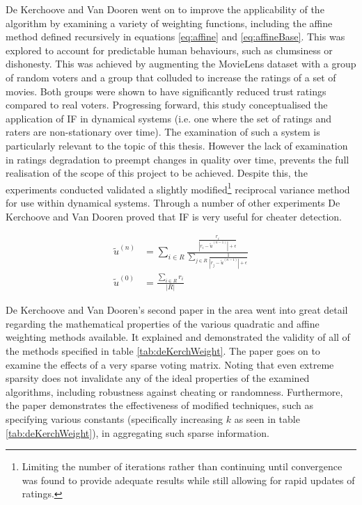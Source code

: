 De Kerchoove and Van Dooren \cite{de2007iterative} went on to improve the applicability of the algorithm by examining a variety of weighting functions, including the affine method defined recursively in equations \ref{eq:affine} and \ref{eq:affineBase}. This was explored to account for predictable human behaviours, such as clumsiness or dishonesty. This was achieved by augmenting the MovieLens dataset with a group of random voters and a group that colluded to increase the ratings of a set of movies. Both groups were shown to have significantly reduced trust ratings compared to real voters.
Progressing forward, this study conceptualised the application of IF in dynamical systems (i.e. one where the set of ratings and raters are non-stationary over time). The examination of such a system is particularly relevant to the topic of this thesis. However the lack of examination in ratings degradation to preempt changes in quality over time, prevents the full realisation of the scope of this project to be achieved. Despite this, the experiments conducted validated a slightly modified\footnote{Limiting the number of iterations rather than continuing until convergence was found to provide adequate results while still allowing for rapid updates of ratings.} reciprocal variance method for use within dynamical systems. Through a number of other experiments De Kerchoove and Van Dooren proved that IF is very useful for cheater detection. 

\begin{align}
    \tilde{u}^{(n)} &= \sum\limits_{i \in R}\frac{\frac{r_i}{|r_i-\tilde{u}^{(n-1)}|+\epsilon}}{\sum\limits_{j\in R} \frac{1}{|r_j-\tilde{u}^{(n-1)}|+\epsilon}} \label{eq:affine} \\
    \tilde{u}^{(0)} &= \frac{\sum\limits_{i\in R} r_i}{|R|}\label{eq:affineBase}
\end{align}


De Kerchoove and Van Dooren's \cite{de2010iterative} second paper in the area went into great detail regarding the mathematical properties of the various quadratic and affine weighting methods available. It explained and demonstrated the validity of all of the methods specified in table \ref{tab:deKerchWeight}. The paper goes on to examine the effects of a very sparse voting matrix. Noting that even extreme sparsity does not invalidate any of the ideal properties of the examined algorithms, including robustness against cheating or randomness. Furthermore, the paper demonstrates the effectiveness of modified techniques, such as specifying various constants (specifically increasing $k$ as seen in table \ref{tab:deKerchWeight}), in aggregating such sparse information.

